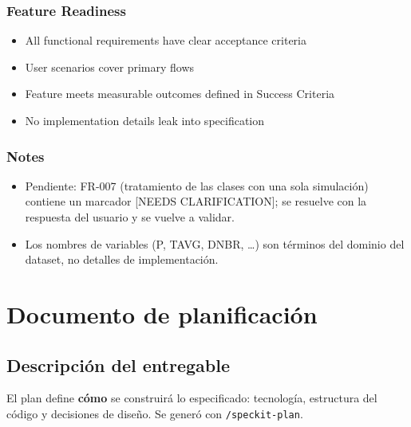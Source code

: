 \documentclass[12pt,a4paper]{article}
\providecommand{\tightlist}{\setlength{\itemsep}{0pt}\setlength{\parskip}{0pt}}
\newenvironment{documentogenerado}[2]{%
  \def\doccomando{#1}\def\docruta{#2}%
  \par\begingroup\small\setstretch{1.15}\sloppy%
}{\endgroup\par\medskip}
\begin{document}
\begin{documentogenerado}{/speckit-specify}{specs\slash 001-preparacion-datos\slash checklists\slash requirements.md}
\subsubsection{Feature Readiness}

\begin{itemize}
\tightlist
\item[$\boxtimes$]
  All functional requirements have clear acceptance criteria
\item[$\boxtimes$]
  User scenarios cover primary flows
\item[$\boxtimes$]
  Feature meets measurable outcomes defined in Success Criteria
\item[$\boxtimes$]
  No implementation details leak into specification
\end{itemize}

\subsubsection{Notes}

\begin{itemize}
\tightlist
\item
  Pendiente: FR-007 (tratamiento de las clases con una sola simulación) contiene un marcador {[}NEEDS CLARIFICATION{]}; se resuelve con la respuesta del usuario y se vuelve a validar.
\item
  Los nombres de variables (P, TAVG, DNBR, \ldots) son términos del dominio del dataset, no detalles de implementación.
\end{itemize}
\end{documentogenerado}

\newpage
\section{Documento de planificación}

\subsection{Descripción del entregable}
El plan define \textbf{cómo} se construirá lo especificado: tecnología, estructura del código y decisiones de diseño. Se generó con \texttt{/speckit-plan}.
\end{document}
